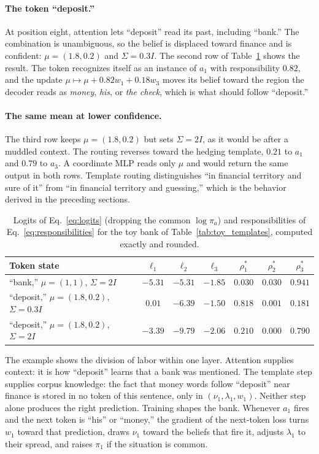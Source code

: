 \documentclass[11pt]{article}
\theoremstyle{definition}
\theoremstyle{remark}
\begin{document}
\paragraph{The token ``deposit.''}
At position eight, attention lets ``deposit'' read its past, including ``bank.'' The combination is unambiguous, so the belief is displaced toward finance and is confident: $\mu=(1.8,0.2)$ and $\Sigma=0.3I$. The second row of Table~\ref{tab:toy_routing} shows the result. The token recognizes itself as an instance of $a_1$ with responsibility $0.82$, and the update $\mu\mapsto\mu+0.82w_1+0.18w_3$ moves its belief toward the region the decoder reads as \emph{money}, \emph{his}, or \emph{the check}, which is what should follow ``deposit.''

\paragraph{The same mean at lower confidence.}
The third row keeps $\mu=(1.8,0.2)$ but sets $\Sigma=2I$, as it would be after a muddled context. The routing reverses toward the hedging template, $0.21$ to $a_1$ and $0.79$ to $a_3$. A coordinate MLP reads only $\mu$ and would return the same output in both rows. Template routing distinguishes ``in financial territory and sure of it'' from ``in financial territory and guessing,'' which is the behavior derived in the preceding sections.

\begin{table}[h]
\centering
\begin{tabular}{@{}lcccccc@{}}
\toprule
Token state & $\ell_{1}$ & $\ell_{2}$ & $\ell_{3}$ & $\rho^{*}_{1}$ & $\rho^{*}_{2}$ & $\rho^{*}_{3}$ \\
\midrule
``bank,'' $\mu=(1,1)$, $\Sigma=2I$ & $-5.31$ & $-5.31$ & $-1.85$ & $0.030$ & $0.030$ & $0.941$ \\
``deposit,'' $\mu=(1.8,0.2)$, $\Sigma=0.3I$ & $0.01$ & $-6.39$ & $-1.50$ & $0.818$ & $0.001$ & $0.181$ \\
``deposit,'' $\mu=(1.8,0.2)$, $\Sigma=2I$ & $-3.39$ & $-9.79$ & $-2.06$ & $0.210$ & $0.000$ & $0.790$ \\
\bottomrule
\end{tabular}
\caption{Logits of Eq.~\eqref{eq:logits} (dropping the common $\log\pi_a$) and responsibilities of Eq.~\eqref{eq:responsibilities} for the toy bank of Table~\ref{tab:toy_templates}, computed exactly and rounded.}
\label{tab:toy_routing}
\end{table}

The example shows the division of labor within one layer. Attention supplies context: it is how ``deposit'' learns that a bank was mentioned. The template step supplies corpus knowledge: the fact that money words follow ``deposit'' near finance is stored in no token of this sentence, only in $(\nu_1,\lambda_1,w_1)$. Neither step alone produces the right prediction. Training shapes the bank. Whenever $a_1$ fires and the next token is ``his'' or ``money,'' the gradient of the next-token loss turns $w_1$ toward that prediction, draws $\nu_1$ toward the beliefs that fire it, adjusts $\lambda_1$ to their spread, and raises $\pi_1$ if the situation is common.
\end{document}

